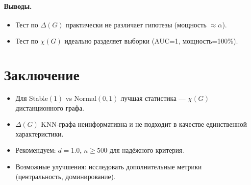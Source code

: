 \documentclass[12pt,a4paper]{article}
\begin{document}
\paragraph{Выводы.}
\begin{itemize}
  \item Тест по $\Delta(G)$ практически не различает гипотезы (мощность $\approx\alpha$).
  \item Тест по $\chi(G)$ идеально разделяет выборки (AUC=1, мощность=100\%).
\end{itemize}

\section*{Заключение}
\begin{itemize}
  \item Для Stable$(1)$ vs Normal$(0,1)$ лучшая статистика — \(\chi(G)\) дистанционного графа.
  \item $\Delta(G)$ KNN‑графа неинформативна и не подходит в качестве единственной характеристики.
  \item Рекомендуем: $d=1.0$, $n\ge500$ для надёжного критерия.
  \item Возможные улучшения: исследовать дополнительные метрики (центральность, доминирование).
\end{itemize}
\end{document}
